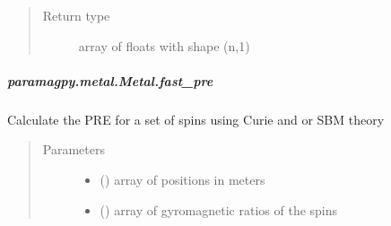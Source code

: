 \documentclass[a4paper,10pt,english,openany,oneside]{sphinxmanual}
\begin{document}
\begin{fulllineitems}
\begin{fulllineitems}
\begin{fulllineitems}
\begin{quote}
\begin{description}
\item[{Return type}] \leavevmode
\sphinxAtStartPar
array of floats with shape (n,1)

\end{description}\end{quote}

\end{fulllineitems}



\subparagraph{paramagpy.metal.Metal.fast\_pre}
\label{\detokenize{reference/generated/paramagpy.metal.Metal.fast_pre:paramagpy-metal-metal-fast-pre}}\label{\detokenize{reference/generated/paramagpy.metal.Metal.fast_pre::doc}}

\begin{fulllineitems}
\label{\detokenize{reference/generated/paramagpy.metal.Metal.fast_pre:paramagpy.metal.Metal.fast_pre}}
\sphinxAtStartPar
Calculate the PRE for a set of spins using Curie and or SBM theory
\begin{quote}\begin{description}
\item[{Parameters}] \leavevmode\begin{itemize}
\item {} 
\sphinxAtStartPar
{} (\sphinxstyleliteralemphasis{\sphinxupquote{ (}}\sphinxstyleliteralemphasis{\sphinxupquote{,}}\sphinxstyleliteralemphasis{\sphinxupquote{)}}) \textendash{} array of positions in meters

\item {} 
\sphinxAtStartPar
{} (\sphinxstyleliteralemphasis{\sphinxupquote{ (}}\sphinxstyleliteralemphasis{\sphinxupquote{,}}\sphinxstyleliteralemphasis{\sphinxupquote{)}}) \textendash{} array of gyromagnetic ratios of the spins


\end{itemize}
\end{description}
\end{quote}
\end{fulllineitems}
\end{fulllineitems}
\end{fulllineitems}
\end{document}
